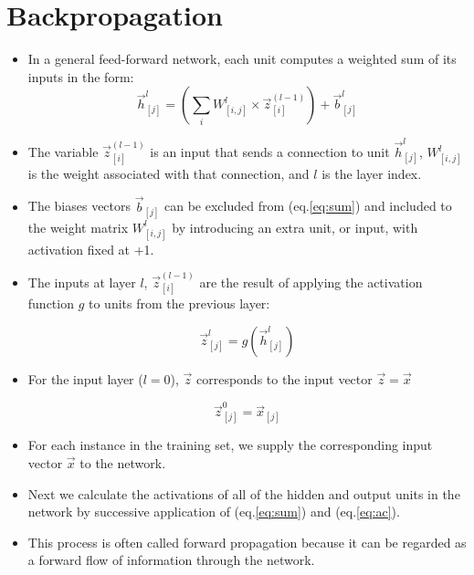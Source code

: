 \section{Backpropagation}
\begin{itemize}
\item In a general feed-forward network, each unit computes a weighted sum of its inputs in the form:
\begin{equation}
\vec{h}_{[j]}^l = \left(\sum_{i}  W_{[i,j]}^l \times \vec{z}_{[i]}^{(l-1)}\right) + \vec{b}_{[j]}^l 
\label{eq:sum}
\end{equation}

\item The variable $\vec{z}_{[i]}^{(l-1)}$ is an input that sends a connection to unit $\vec{h}_{[j]}^l$, $W_{[i,j]}^l$ is the weight associated with that connection, and $l$ is the layer index.

\item The biases vectors  $\vec{b}_{[j]}$ can be excluded from (eq.\ref{eq:sum}) and included to the weight matrix $W_{[i,j]}^l$ by introducing an extra unit, or input, with activation fixed at +1.

\item The inputs at layer $l$, $\vec{z}_{[i]}^{(l-1)}$ are the result of applying the activation function $g$ to units from the previous layer:

\begin{equation}
\vec{z}_{[j]}^{l} = g(\vec{h}_{[j]}^{l})
\label{eq:ac}
\end{equation}

\item For the input layer ($l=0$), $\vec{z}$ corresponds to the input vector $\vec{z} = \vec{x}$ 

\begin{equation}
\vec{z}_{[j]}^0 = \vec{x}_{[j]}
\end{equation}

\item For each instance in the training set, we supply the corresponding input vector $\vec{x}$ to the network.
\item Next we calculate the activations of all of the hidden and output units in the network by successive application of (eq.\ref{eq:sum}) and (eq.\ref{eq:ac}). 

\item This process is often called forward propagation because it can be regarded
as a forward flow of information through the network.


\end{itemize}

